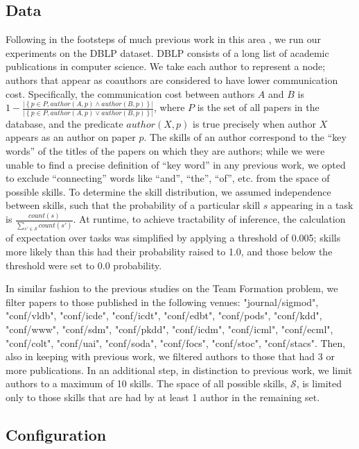 \subsection{Data}

Following in the footsteps of much previous work in this area \cite{lappas2009finding, kargar2011discovering, bhowmik2014submodularity}, we run our experiments on the DBLP dataset.
DBLP consists of a long list of academic publications in computer science.
We take each author to represent a node; authors that appear as coauthors are considered to have lower communication cost.
Specifically, the communication cost between authors $ A $ and $ B $ is $ 1 - \frac{| \left\{ p \in P, author(A, p) \land author(B, p) \right\} |}{| \left\{ p \in P, author(A, p) \lor author(B, p) \right\} |} $, where $ P $ is the set of all papers in the database, and the predicate $ author(X, p) $ is true precisely when author $ X $ appears as an author on paper $ p $.
The skills of an author correspond to the ``key words'' of the titles of the papers on which they are authors; while we were unable to find a precise definition of ``key word'' in any previous work, we opted to exclude ``connecting'' words like ``and'', ``the'', ``of'', etc. from the space of possible skills.
To determine the skill distribution, we assumed independence between skills, such that the probability of a particular skill $ s $ appearing in a task is $ \frac{count(s)}{\sum_{s' \in \mathcal{S}} count(s')} $.
At runtime, to achieve tractability of inference, the calculation of expectation over tasks was simplified by applying a threshold of 0.005; skills more likely than this had their probability raised to 1.0, and those below the threshold were set to 0.0 probability.

In similar fashion to the previous studies on the Team Formation problem, we filter papers to those published in the following venues: "journal/sigmod", "conf/vldb", "conf/icde", "conf/icdt", "conf/edbt", "conf/pods", "conf/kdd", "conf/www", "conf/sdm", "conf/pkdd", "conf/icdm", "conf/icml", "conf/ecml", "conf/colt", "conf/uai", "conf/soda", "conf/focs", "conf/stoc", "conf/stacs".
Then, also in keeping with previous work, we filtered authors to those that had 3 or more publications.
In an additional step, in distinction to previous work, we limit authors to a maximum of 10 skills.
The space of all possible skills, $ \mathcal{S} $, is limited only to those skills that are had by at least 1 author in the remaining set.

\subsection{Configuration}

